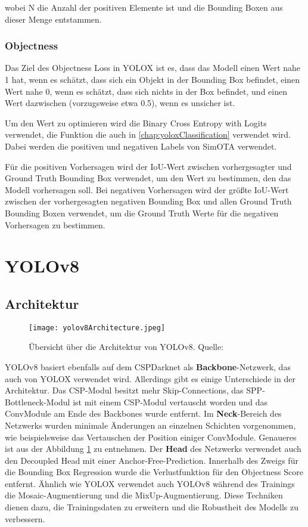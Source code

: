 wobei N die Anzahl der positiven Elemente ist und die Bounding Boxen aus dieser Menge entstammen. \cite{yoloxExplanationHowWorks}

\subsubsection{Objectness}
Das Ziel des Objectness Loss in YOLOX ist es, dass das Modell einen Wert nahe 1 hat, wenn es schätzt, dass sich ein Objekt in der Bounding Box befindet, einen Wert nahe 0, wenn es schätzt, dass sich nichts in der Box befindet, und einen Wert dazwischen (vorzugsweise etwa 0.5), wenn es unsicher ist.

Um den Wert zu optimieren wird die Binary Cross Entropy with Logits verwendet, die Funktion die auch in \ref{chap:yoloxClassification} verwendet wird. Dabei werden die positiven und negativen Labels von SimOTA verwendet.

Für die positiven Vorhersagen wird der IoU-Wert zwischen vorhergesagter und Ground Truth Bounding Box verwendet, um den Wert zu bestimmen, den das Modell vorhersagen soll. Bei negativen Vorhersagen wird der größte IoU-Wert zwischen der vorhergesagten negativen Bounding Box und allen Ground Truth Bounding Boxen verwendet, um die Ground Truth Werte für die negativen Vorhersagen zu bestimmen. \cite{yoloxExplanationHowWorks}


\section{YOLOv8}\label{chap:yolov8}
\subsection{Architektur}
\begin{figure}[h]
	\centering
	\texttt{[image: yolov8Architecture.jpeg]}
	\caption[Übersicht über die Architektur von YOLOv8]{Übersicht über die Architektur von YOLOv8. Quelle: \cite{yoloArchitecture}}
	\label{fig:yolov8Architecture}
\end{figure}

YOLOv8 basiert ebenfalls auf dem CSPDarknet als \textbf{Backbone}-Netzwerk, das auch von YOLOX verwendet wird. Allerdings gibt es einige Unterschiede in der Architektur. Das CSP-Modul besitzt mehr Skip-Connections, das SPP-Bottleneck-Modul ist mit einem CSP-Modul vertauscht worden und das ConvModule am Ende des Backbones wurde entfernt. Im \textbf{Neck}-Bereich des Netzwerks wurden minimale Änderungen an einzelnen Schichten vorgenommen, wie beispielsweise das Vertauschen der Position einiger ConvModule. Genaueres ist aus der Abbildung \ref{fig:yolov8Architecture} zu entnehmen.
Der \textbf{Head} des Netzwerks verwendet auch den Decoupled Head mit einer Anchor-Free-Prediction. Innerhalb des Zweigs für die Bounding Box Regression wurde die Verlustfunktion für den Objectness Score entfernt. Ähnlich wie YOLOX verwendet auch YOLOv8 während des Trainings die Mosaic-Augmentierung und die MixUp-Augmentierung. Diese Techniken dienen dazu, die Trainingsdaten zu erweitern und die Robustheit des Modells zu verbessern. \cite{yolov8ModelExplanation}

